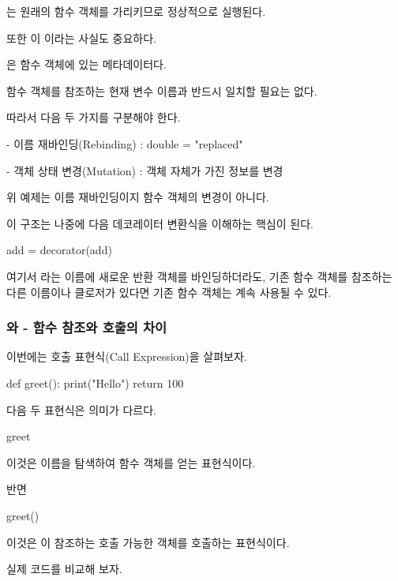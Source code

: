 는 원래의 함수 객체를 가리키므로 정상적으로 실행된다.

또한 이 이라는 사실도 중요하다.

은 함수 객체에 있는 메타데이터다.

함수 객체를 참조하는 현재 변수 이름과 반드시 일치할 필요는 없다.

따라서 다음 두 가지를 구분해야 한다.

\begin{dhksmry}
    - 이름 재바인딩(Rebinding) : double = "replaced"

    - 객체 상태 변경(Mutation) : 객체 자체가 가진 정보를 변경
\end{dhksmry}

위 예제는 이름 재바인딩이지 함수 객체의 변경이 아니다.

이 구조는 나중에 다음 데코레이터 변환식을 이해하는 핵심이 된다.

\begin{dhkcode}
add = decorator(add)
\end{dhkcode}

여기서 라는 이름에 새로운 반환 객체를 바인딩하더라도, 기존 함수 객체를 참조하는 다른 이름이나 클로저가 있다면 기존 함수 객체는 계속 사용될 수 있다.

\subsubsection{와  - 함수 참조와 호출의 차이}

이번에는 호출 표현식(Call Expression)을 살펴보자.

\begin{dhkcode}
def greet():
    print("Hello")
    return 100
\end{dhkcode}

다음 두 표현식은 의미가 다르다.

\begin{dhkcode}
greet
\end{dhkcode}

이것은 이름을 탐색하여 함수 객체를 얻는 표현식이다.

반면

\begin{dhkcode}
greet()
\end{dhkcode}

이것은 이 참조하는 호출 가능한 객체를 호출하는 표현식이다.

실제 코드를 비교해 보자.

